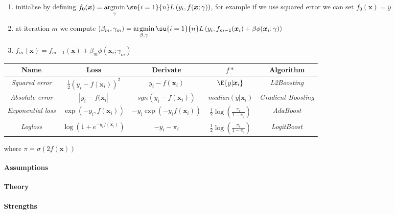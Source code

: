 \begin{enumerate}
    \item initialise by defining $f_{0}(\bm{x}) = \displaystyle\argmin_{\gamma}\su{i=1}{n}L\left(
        y_{i},f(\bm{x};\gamma)\right)$, for example if we use squared error we can
        set $f_{0}(\bm{x})=\overline{y}$
    \item at iteration $m$ we compute $(\beta_{m},\gamma_{m}) = \displaystyle\argmin_{\beta,\gamma}
        \su{i=1}{n}L\left(y_{i},f_{m-1}(\bm{x}_{i})+\beta\phi(\bm{x}_{i};\gamma)
        \right)$
    \item $f_{m}(\bm{x}) = f_{m-1}(\bm{x}) + \beta_{m}\phi(\bm{x}_{i};\gamma_{m})$
\end{enumerate}

\begin{center}
    \begin{tabular}{|*{5}{c|}}
    \hline
    \textbf{Name} & \textbf{Loss}& \textbf{Derivate}& \textbf{$f{*}$} & \textbf{Algorithm}\\
    \hline
    \emph{Squared error} & $\frac{1}{2}\left(y_{i}-f(\bm{x}_{i})\right)^{2}$ & 
    $y_{i}-f(\bm{x}_{i})$ & $\E{y|\bm{x}_{i}}$ & \emph{L2Boosting}\\
    \hline
    \emph{Absolute error} & $|y_{i}-f(\bm{x}_{i}|$ & 
    $sgn(y_{i}-f(\bm{x}_{i}))$ & \emph{median}$(y|\bm{x}_{i})$ & \emph{Gradient 
    Boosting}\\
    \hline
    \emph{Exponential loss} & $\exp\left(-y_{i},f(\bm{x}_{i})\right)$ & $-y_{i}\exp(
    -y_{i}f(\bm{x}_{i}))$ & $\frac{1}{2}\log\left(\frac{\pi_{i}}{1 - \pi_{i}}\right)$&
    \emph{AdaBoost}\\
    \hline
    \emph{Logloss} & $\log\left(1+e^{-y_{i}f(\bm{x}_{i})}\right)$ & $-y_{i}-\pi_{i}$ &
    $\frac{1}{2}\log\left(\frac{\pi_{i}}{1 - \pi_{i}}\right)$ & \emph{LogitBoost}\\
    \hline
    \end{tabular}
\end{center}
where $\pi=\sigma\left(2f(\bm{x})\right)$


\paragraph{Assumptions}
\paragraph{Theory}
\paragraph{Strengths}
